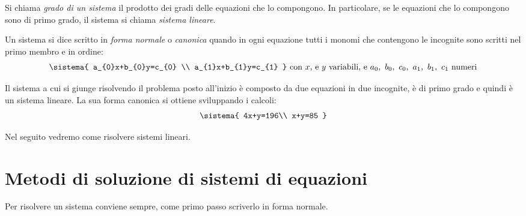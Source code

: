 \begin{definizione}{}{}
Si chiama \emph{grado di un sistema} il prodotto dei gradi delle
equazioni che lo compongono. 
In particolare, se le equazioni che lo compongono sono di primo grado, 
il sistema si chiama \emph{sistema lineare}.
\end{definizione}

\begin{definizione}{}{}
Un sistema si dice scritto in \emph{forma normale} o \emph{canonica} 
quando in ogni equazione tutti i monomi che contengono le incognite sono 
scritti nel primo membro e in ordine:\\[-.5em]
\[\sistema{
 a_{0}x+b_{0}y=c_{0} \\
 a_{1}x+b_{1}y=c_{1} 
}
\text{ con }x \text{, e } y \text{ variabili} \text{, e } 
a_{0},~b_{0},~c_{0},~a_{1},~b_{1},~c_{1}\text{ numeri}\]
\end{definizione}

\begin{soluzione}
Il sistema a cui si giunge risolvendo il problema posto all'inizio è
composto da due equazioni in due incognite, è di primo grado 
e quindi è un sistema lineare. 
La sua forma canonica si ottiene sviluppando i calcoli:\\[-.5em]
\[\sistema{
4x+y=196\\
x+y=85
}\]
\end{soluzione}

Nel seguito vedremo come risolvere sistemi lineari.

\section{Metodi di soluzione di sistemi di equazioni}
\label{sec:sist_soluzione}

Per risolvere un sistema conviene sempre, come primo passo scriverlo in 
forma normale.

